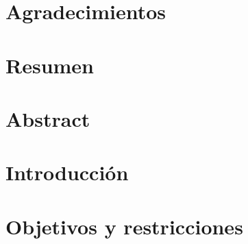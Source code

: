 \documentclass[11pt,twoside]{docs/thesis}
\begin{document}
\maketitle
\makecoverletter

\chapter*{Agradecimientos} 

\makenomenclature


\chapter*{Resumen}  
\chapter*{Abstract} 


\tableofcontents %
\listoffigures 	  %
\renewcommand\listtablename{Índice de tablas}
\listoftables     %
\clearpage %
\mainmatter       %

\dominitoc
\cleardoublepage

\chapter{Introducción}



\chapter{Objetivos y restricciones} \label{Objs}

\end{document}
